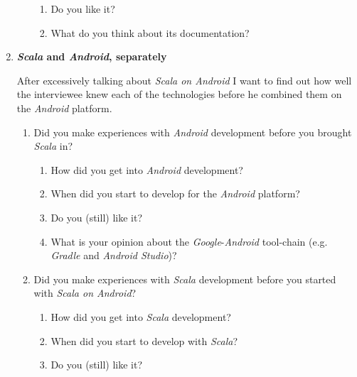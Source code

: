 \begin{enumerate}
\begin{enumerate}
\begin{enumerate}
			\item Do you like it?

			\item What do you think about its documentation?

		\end{enumerate}

	\end{enumerate}

	\item \textbf{\textit{Scala} and \textit{Android}, separately}

	After excessively talking about \textit{Scala on Android} I want to find out how well the interviewee knew each of the technologies before he combined them on the \textit{Android} platform.

	\begin{enumerate}

		\item Did you make experiences with \textit{Android} development before you brought \textit{Scala} in?

		\begin{enumerate}

			\item How did you get into \textit{Android} development?

			\item When did you start to develop for the \textit{Android} platform?

			\item Do you (still) like it?

			\item What is your opinion about the \textit{Google}-\textit{Android} tool-chain (e.g. \textit{Gradle} and \textit{Android Studio})?

		\end{enumerate}

		\item Did you make experiences with \textit{Scala} development before you started with \textit{Scala on Android}?

		\begin{enumerate}

			\item How did you get into \textit{Scala} development?

			\item When did you start to develop with \textit{Scala}?

			\item Do you (still) like it?


\end{enumerate}
\end{enumerate}
\end{enumerate}

